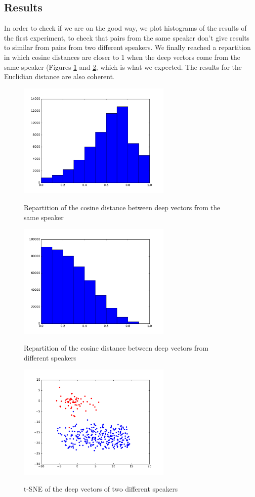 \documentclass[conference]{IEEEtran}
\begin{document}
\subsection{Results}

In order to check if we are on the good way, we plot histograms of the results of the first experiment, to check that pairs from the same speaker don't give results to similar from pairs from two different speakers. We finally reached a repartition in which cosine distances are closer to 1 when the deep vectors come from the same speaker (Figures \ref{cos_same} and \ref{cos_diff}, which is what we expected. The results for the Euclidian distance are also coherent.
  
\begin{figure}[!h]
    \centering
    \includegraphics[width=7.5cm]{../secondNet/cosine_same.pdf}
    \label{cos_same}
    \caption{Repartition of the cosine distance between deep vectors from the same speaker}
\end{figure}
\begin{figure}[!h]
    \centering
    \includegraphics[width=7.5cm]{../secondNet/cosine_diff.pdf}
	\label{cos_diff}    
    \caption{Repartition of the cosine distance between deep vectors from different speakers}
\end{figure}

\begin{figure}[!h]
    \centering
    \includegraphics[width=7.5cm]{../secondNet/tSNE_HOUDIN_TRUCHOT.pdf}
	\label{tSNE}
    \caption{t-SNE of the deep vectors of two different speakers}
\end{figure}
\end{document}
